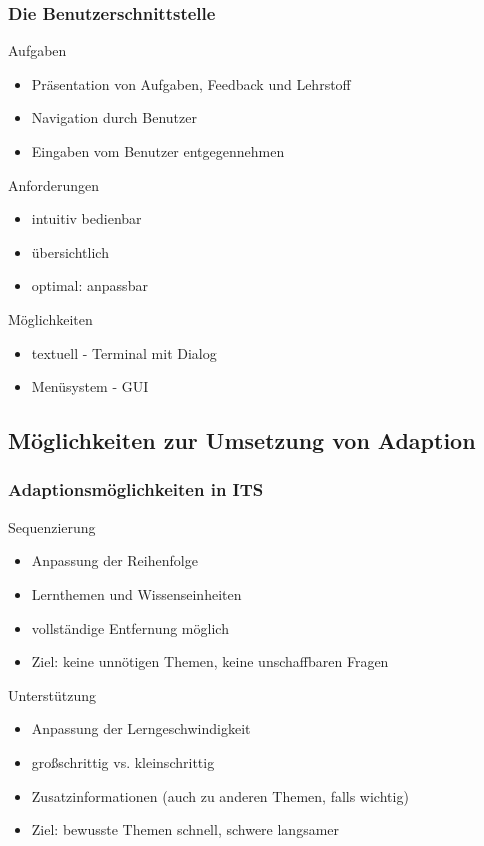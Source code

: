 \documentclass{beamer}
\begin{document}
\begin{frame}
  \frametitle{Die Benutzerschnittstelle}

  \begin{block}{Aufgaben}
    \begin{itemize}
      \item Präsentation von Aufgaben, Feedback und Lehrstoff
      \item Navigation durch Benutzer
      \item Eingaben vom Benutzer entgegennehmen
    \end{itemize}
  \end{block}

  \begin{block}{Anforderungen}
    \begin{itemize}
      \item intuitiv bedienbar
      \item übersichtlich
      \item optimal: anpassbar
    \end{itemize}
  \end{block}

  \begin{block}{Möglichkeiten}
    \begin{itemize}
      \item textuell - Terminal mit Dialog
      \item Menüsystem - GUI
    \end{itemize}
  \end{block}
\end{frame}

\subsection{Möglichkeiten zur Umsetzung von Adaption}
\begin{frame}
  \frametitle{Adaptionsmöglichkeiten in ITS}
  \begin{block}{Sequenzierung}
    \begin{itemize}
      \item Anpassung der Reihenfolge
      \item Lernthemen und Wissenseinheiten
      \item vollständige Entfernung möglich
      \item Ziel: keine unnötigen Themen, keine unschaffbaren Fragen
    \end{itemize}
  \end{block}

  \begin{block}{Unterstützung}
    \begin{itemize}
      \item Anpassung der Lerngeschwindigkeit
      \item großschrittig vs. kleinschrittig
      \item Zusatzinformationen (auch zu anderen Themen, falls wichtig)
      \item Ziel: bewusste Themen schnell, schwere langsamer
    \end{itemize}
  \end{block}
\end{frame}
\end{document}
